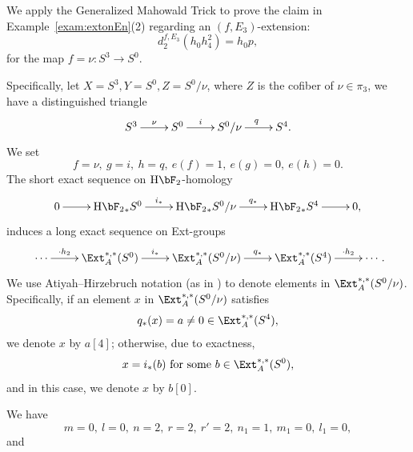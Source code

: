 \documentclass{amsart}
\numberwithin{equation}{section}
\newcommand{\HF}{\mathrm{H}\bF_2}
\begin{document}
\begin{example} \label{exam:Mahowald}
    We apply the Generalized Mahowald Trick to prove the claim in Example~\ref{exam:extonEn}(2) regarding an $(f, E_3)$-extension:
        $$d_2^{f, E_3} (h_0h_4^2) = h_0 p,$$
        for the map $f=\nu:S^3 \rightarrow S^0$.

        Specifically, let $X = S^3, Y = S^0, Z = S^0/\nu$, where $Z$ is the cofiber of $\nu \in \pi_3$, we have a distinguished triangle
        $$\xymatrix{S^3 \ar[r]^{\nu} & S^0 \ar[r]^-{i} & S^0/\nu \ar[r]^{q} & S^4.}$$
We set
$$f=\nu, \ g=i, \ h=q, \ e(f)=1, \ e(g)=0, \ e(h)=0.$$
The short exact sequence on $\HF$-homology
$$\xymatrix{0 \ar[r] & {\HF}_*S^0 \ar[r]^-{i_*} & {\HF}_*S^0/\nu \ar[r]^-{q_*} & {\HF}_*S^4 \ar[r] & 0,}$$
induces a long exact sequence on Ext-groups
$$\xymatrix{\cdots \ar[r]^-{\cdot h_2} & {\Ext}_A^{*,*}(S^0) \ar[r]^-{i_*} & {\Ext}_A^{*,*}(S^0/\nu) \ar[r]^-{q_*} & {\Ext}_A^{*,*}(S^4) \ar[r]^-{\cdot h_2} & \cdots}.$$
We use Atiyah--Hirzebruch notation (as in \cite[Notation 3.3]{WX61, WangXu51ext}) to denote elements in ${\Ext}_A^{*,*}(S^0/\nu)$. Specifically, if an element $x$ in ${\Ext}_A^{*,*}(S^0/\nu)$ satisfies 
$$q_*(x) = a \neq 0 \in \Ext_A^{*,*}(S^4),$$ 
we denote $x$ by $a[4]$; otherwise, due to exactness, 
$$x = i_*(b) \ \text{for some} \ b \in \Ext_A^{*,*}(S^0),$$
and in this case, we denote $x$ by $b[0]$. 

We have
$$m=0, \ l=0, \ n=2, \ r=2, \ r'=2, \ n_1=1, \ m_1=0, \ l_1=0,$$
and


\end{example}
\end{document}
